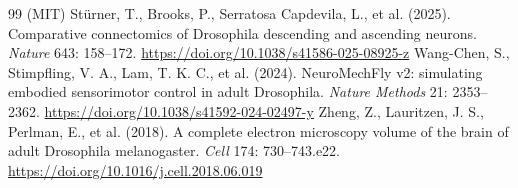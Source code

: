 \documentclass[11pt,a4paper]{article}
\begin{document}
\begin{thebibliography}{99}
(MIT)
 Stürner, T., Brooks, P., Serratosa Capdevila, L., et al.
(2025). Comparative connectomics of Drosophila descending and ascending
neurons. \emph{Nature} 643: 158--172.
\url{https://doi.org/10.1038/s41586-025-08925-z}
 Wang-Chen, S., Stimpfling, V. A., Lam, T. K. C., et al.
(2024). NeuroMechFly v2: simulating embodied sensorimotor control in adult
Drosophila. \emph{Nature Methods} 21: 2353--2362.
\url{https://doi.org/10.1038/s41592-024-02497-y}
 Zheng, Z., Lauritzen, J. S., Perlman, E., et al. (2018). A
complete electron microscopy volume of the brain of adult Drosophila
melanogaster. \emph{Cell} 174: 730--743.e22.
\url{https://doi.org/10.1016/j.cell.2018.06.019}
\end{thebibliography}
\end{document}
